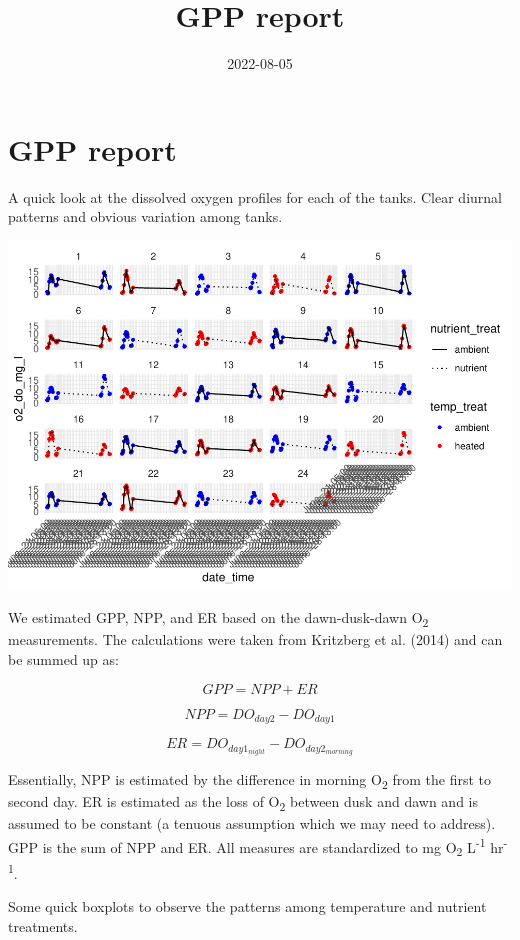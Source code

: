 \documentclass[
]{article}
\title{GPP report}
\author{}
\date{\vspace{-2.5em}2022-08-05}
\begin{document}
\maketitle

\hypertarget{gpp-report}{%
\section{GPP report}\label{gpp-report}}

A quick look at the dissolved oxygen profiles for each of the tanks.
Clear diurnal patterns and obvious variation among tanks.

\includegraphics{GPP-report_files/figure-latex/DO profiles-1.pdf}

We estimated GPP, NPP, and ER based on the dawn-dusk-dawn
O\textsubscript{2} measurements. The calculations were taken from
Kritzberg et al. (2014) and can be summed up as:

\[ GPP = NPP + ER \]

\[ NPP = DO_{day2} - DO_{day1} \]

\[ ER = DO_{day1_{night}} - DO_{day2_{morning}} \]

Essentially, NPP is estimated by the difference in morning
O\textsubscript{2} from the first to second day. ER is estimated as the
loss of O\textsubscript{2} between dusk and dawn and is assumed to be
constant (a tenuous assumption which we may need to address). GPP is the
sum of NPP and ER. All measures are standardized to mg
O\textsubscript{2} L\textsuperscript{-1} hr\textsuperscript{-1}.

Some quick boxplots to observe the patterns among temperature and
nutrient treatments.
\end{document}
